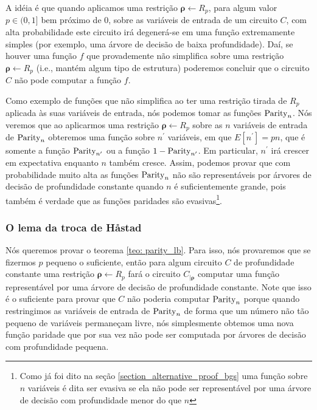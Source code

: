 A idéia é que quando aplicamos uma restrição $\boldsymbol{\rho} \leftarrow R_{p}$, para algum valor $p \in (0, 1]$ bem próximo de 0, sobre as variáveis de entrada de um circuito $C$, com alta probabilidade este circuito irá degenerá-se em uma função extremamente simples (por exemplo, uma árvore de decisão de baixa profundidade). Daí, se houver uma função $f$ que provademente não simplifica sobre uma restrição $\boldsymbol{\rho} \leftarrow R_{p}$ (i.e., mantém algum tipo de estrutura) poderemos concluir que o circuito $C$ não pode computar a função $f$.

Como exemplo de funções que não simplifica ao ter uma restrição tirada de $R_{p}$ aplicada às suas variáveis de entrada, nós podemos tomar as funções $\text{Parity}_{n}$. Nós veremos que ao aplicarmos uma restrição $\boldsymbol{\rho} \leftarrow R_{p}$ sobre as $n$ variáveis de entrada de $\text{Parity}_{n}$ obteremos uma função sobre $n^{\prime}$ variáveis, em que $E[n^{\prime}] = pn$, que é somente a função $\text{Parity}_{n^{\prime}}$ ou a função $1 - \text{Parity}_{n^{\prime}}$. Em particular, $n^{\prime}$ irá crescer em expectativa enquanto $n$ também cresce. Assim, podemos provar que com probabilidade muito alta as funções $\text{Parity}_{n}$ não são representáveis por árvores de decisão de profundidade constante quando $n$ é suficientemente grande, pois também é verdade que as funções paridades são evasivas\footnote{Como já foi dito na seção \ref{section_alternative_proof_bgs} uma função sobre $n$ variáveis é dita ser evasiva se ela não pode ser representável por uma árvore de decisão com profundidade menor do que $n$}.

\subsubsection{O lema da troca de Håstad}

Nós queremos provar o teorema \ref{teo: parity_lb}. Para isso, nós provaremos que se fizermos $p$ pequeno o suficiente, então para algum circuito $C$ de profundidade constante uma restrição $\boldsymbol{\rho} \leftarrow R_{p}$ fará o circuito $C_{\lvert \boldsymbol{\rho}}$ computar uma função representável por uma árvore de decisão de profundidade constante. Note que isso é o suficiente para provar que $C$ não poderia computar $\text{Parity}_{n}$ porque quando restringimos as variáveis de entrada de $\text{Parity}_{n}$ de forma que um número não tão pequeno de variáveis permaneçam livre, nós simplesmente obtemos uma nova função paridade que por sua vez não pode ser computada por árvores de decisão com profundidade pequena.

